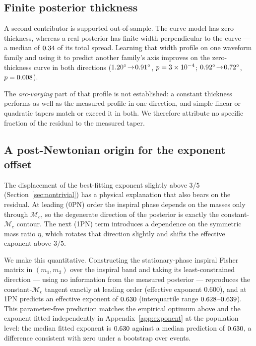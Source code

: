 \documentclass[aps,prd,twocolumn,amsmath,amssymb,nofootinbib,superscriptaddress]{revtex4-2}
\begin{document}
\subsection{Finite posterior thickness}
\label{sec:thickness}
A second contributor is supported out-of-sample. The curve model has zero thickness, whereas a real
posterior has finite width perpendicular to the curve --- a median of $0.34$ of its total spread.
Learning that width profile on one waveform family and using it to predict another family's axis improves
on the zero-thickness curve in both directions ($1.20^\circ\!\to\!0.91^\circ$,
$p=3\times10^{-4}$; $0.92^\circ\!\to\!0.72^\circ$, $p=0.008$).

The \emph{arc-varying} part of that profile is not established: a constant thickness performs as well as
the measured profile in one direction, and simple linear or quadratic tapers match or exceed it in both. We
therefore attribute no specific fraction of the residual to the measured taper.

\subsection{A post-Newtonian origin for the exponent offset}
\label{sec:onepn}
The displacement of the best-fitting exponent slightly above $3/5$ (Section~\ref{sec:nontrivial}) has a
physical explanation that also bears on the residual. At leading (0PN) order the inspiral phase depends on
the masses only through $\mathcal{M}_c$, so the degenerate direction of the posterior is exactly the
constant-$\mathcal{M}_c$ contour. The next (1PN) term introduces a dependence on the symmetric mass ratio
$\eta$, which rotates that direction slightly and shifts the effective exponent above $3/5$.

We make this quantitative. Constructing the stationary-phase inspiral Fisher matrix in $(m_1,m_2)$ over the
inspiral band and taking its least-constrained direction --- using no information from the measured
posterior --- reproduces the constant-$\mathcal{M}_c$ tangent exactly at leading order (effective exponent
$0.600$), and at 1PN predicts an effective exponent of $0.630$ (interquartile range
$0.628$--$0.639$). This parameter-free prediction matches the empirical optimum above and
the exponent fitted independently in Appendix~\ref{app:exponent} at the population level: the median
fitted exponent is $0.630$ against a median prediction of $0.630$, a difference consistent with
zero under a bootstrap over events.
\end{document}
